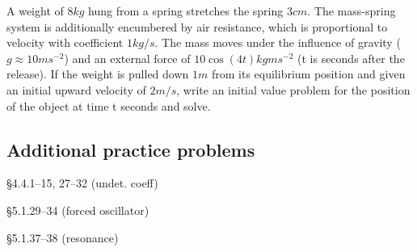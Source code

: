 \begin{question}
A weight of \(8 \si{kg}\) hung from a spring stretches the spring \(3\si{cm}\). The mass-spring system is additionally encumbered by air resistance, which is proportional to velocity with coefficient \(1 \si{kg/s}\). The mass moves under the influence of gravity (\(g \approx 10 ms^{-2}\)) and an external force of $10\cos(4t) \si{kgms^{-2}}$ (t is seconds
after the release). If the weight is pulled down \(1 \si{m}\) from its equilibrium position
and given an initial upward velocity of \(2 \si{m/s}\), write an initial value problem for the position of
the object at time t seconds and solve.
\end{question}

\subsection*{Additional practice problems}


\begin{colenumerate}
  \item {} \S 4.4.1--15, 27--32 (undet. coeff)
  \item {} \S 5.1.29--34 (forced oscillator)
  \item {} \S 5.1.37--38 (resonance)
\end{colenumerate}

